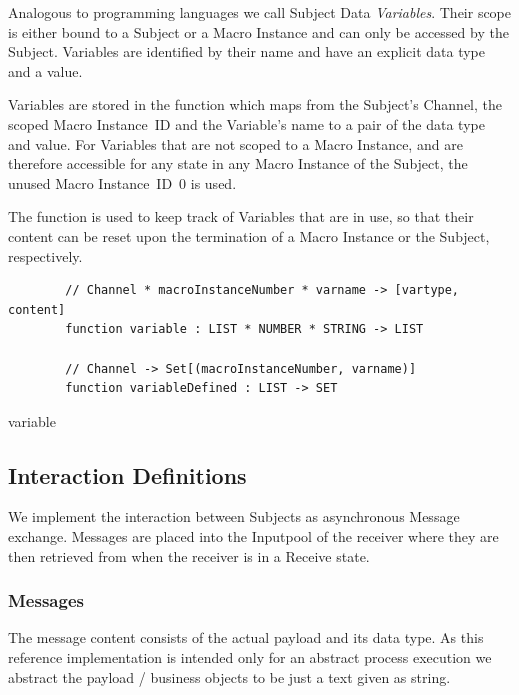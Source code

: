 
Analogous to programming languages we call Subject Data \textit{Variables}.
Their scope is either bound to a Subject or a Macro Instance and can only be
accessed by the Subject. Variables are identified by their name and have an
explicit data type and a value.

Variables are stored in the  function which maps from
the Subject's Channel, the scoped Macro Instance~ID and the Variable's name to
a pair of the data type and value. For Variables that are not scoped to a Macro
Instance, and are therefore accessible for any state in any Macro Instance of
the Subject, the unused Macro Instance~ID~0 is used.

The function  is used to keep track of Variables
that are in use, so that their content can be reset upon the termination of a
Macro Instance or the Subject, respectively.


\begin{listing}[H]
	\begin{verbatim}
		// Channel * macroInstanceNumber * varname -> [vartype, content]
		function variable : LIST * NUMBER * STRING -> LIST
		
		// Channel -> Set[(macroInstanceNumber, varname)]
		function variableDefined : LIST -> SET
	\end{verbatim}
	\caption{variable}
	\label{lst:shortasm:variable}
\end{listing}




\subsection{Interaction Definitions}\label{sec:InteractionDefinitions}

We implement the interaction between Subjects as asynchronous Message exchange.
Messages are placed into the Inputpool of the receiver where they are then retrieved from when the receiver is in a Receive state.


\subsubsection{Messages}\label{sec:messages}

The message content consists of the actual payload and its data type. As this
reference implementation is intended only for an abstract process execution we abstract
the payload / business objects to be just a text given as string.

